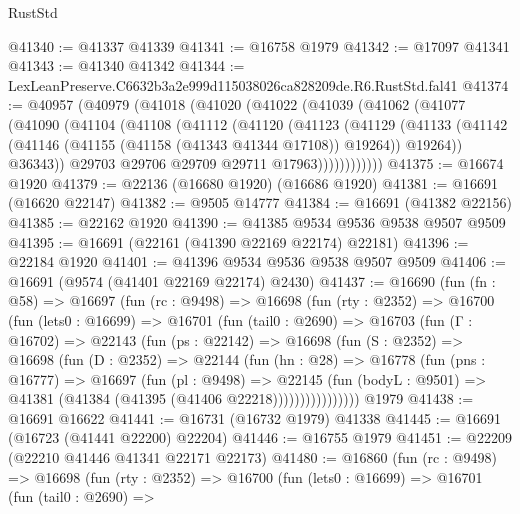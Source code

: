\begin{lexlean}{RustStd}
\begin{coremodule}
@41340 := @41337 @41339
@41341 := @16758 @1979
@41342 := @17097 @41341
@41343 := @41340 @41342
@41344 := LexLeanPreserve.C6632b3a2e999d115038026ca828209de.R6.RustStd.fal41
@41374 := @40957
    (@40979
      (@41018
        (@41020
          (@41022
            (@41039
              (@41062
                (@41077
                  (@41090
                    (@41104
                      (@41108
                        (@41112
                          (@41120
                            (@41123
                              (@41129
                                (@41133
                                  (@41142
                                    (@41146 (@41155 (@41158 (@41343 @41344 @17108)) @19264))
                                    @19264))
                                @36343))
                            @29703
                            @29706
                            @29709
                            @29711
                            @17963))))))))))))
@41375 := @16674 @1920
@41379 := @22136 (@16680 @1920) (@16686 @1920)
@41381 := @16691 (@16620 @22147)
@41382 := @9505 @14777
@41384 := @16691 (@41382 @22156)
@41385 := @22162 @1920
@41390 := @41385 @9534 @9536 @9538 @9507 @9509
@41395 := @16691 (@22161 (@41390 @22169 @22174) @22181)
@41396 := @22184 @1920
@41401 := @41396 @9534 @9536 @9538 @9507 @9509
@41406 := @16691 (@9574 (@41401 @22169 @22174) @2430)
@41437 := @16690
    (fun (fn : @58) =>
    @16697
      (fun (rc : @9498) =>
      @16698
        (fun (rty : @2352) =>
        @16700
          (fun (lets0 : @16699) =>
          @16701
            (fun (tail0 : @2690) =>
            @16703
              (fun (Γ : @16702) =>
              @22143
                (fun (ps : @22142) =>
                @16698
                  (fun (S : @2352) =>
                  @16698
                    (fun (D : @2352) =>
                    @22144
                      (fun (hn : @28) =>
                      @16778
                        (fun (pns : @16777) =>
                        @16697
                          (fun (pl : @9498) =>
                          @22145
                            (fun (bodyL : @9501) =>
                            @41381 (@41384 (@41395 (@41406 @22218))))))))))))))))
    @1979
@41438 := @16691 @16622
@41441 := @16731 (@16732 @1979) @41338
@41445 := @16691 (@16723 (@41441 @22200) @22204)
@41446 := @16755 @1979
@41451 := @22209 (@22210 @41446 @41341 @22171 @22173)
@41480 := @16860
    (fun (rc : @9498) =>
    @16698
      (fun (rty : @2352) =>
      @16700
        (fun (lets0 : @16699) =>
        @16701
          (fun (tail0 : @2690) =>

\end{coremodule}
\end{lexlean}
